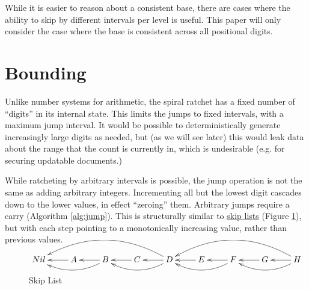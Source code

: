 \documentclass{article}
\begin{document}
	While it is easier to reason about a consistent base, there are cases where the ability to skip by different intervals per level is useful. This paper will only consider the case where the base is consistent across all positional digits.
    
    \section{Bounding}
    
    Unlike number systems for arithmetic, the spiral ratchet has a fixed number of ``digits'' in its internal state. This limits the jumps to fixed intervals, with a maximum jump interval.  It would be possible to deterministically generate increasingly large digits as needed, but (as we will see later) this would leak data about the range that the count is currently in, which is undesirable (e.g. for securing updatable documents.)
    
    While ratcheting by arbitrary intervals is possible, the jump operation is not the same as adding arbitrary integers. Incrementing all but the lowest digit cascades down to the lower values, in effect ``zeroing'' them. Arbitrary jumps require a carry (Algorithm \ref{alg:jump}). This is structurally similar to \href{https://en.wikipedia.org/wiki/Skip_list}{skip lists} (Figure \ref{fig:skip-list}), but with each step pointing to a monotonically increasing value, rather than previous values. \\
 
	\begin{figure}[h]
		\centering
		
		$\xymatrix{
			  Nil
			& A \ar[l]
			& B \ar[l] , \ar@/^1pc/[ll]
			& C \ar[l]
			& D \ar[l] , \ar@/^1pc/[ll] , \ar@/_2pc/[llll]
			& E \ar[l]
			& F \ar[l] , \ar@/^1pc/[ll]
			& G \ar[l]
			& H \ar[l] , \ar@/^1pc/[ll] , \ar@/_2pc/[llll]
		}$
	
		\caption{Skip List}
		\label{fig:skip-list}
	\end{figure}
\end{document}
